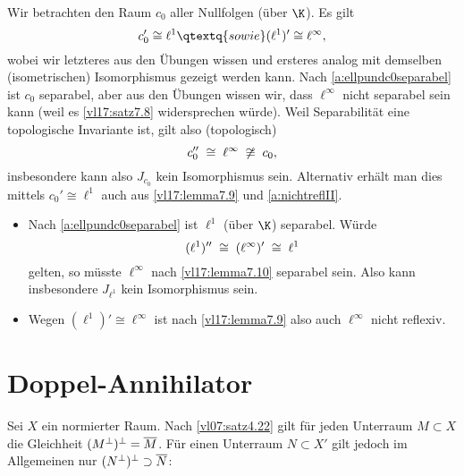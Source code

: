 \begin{thBeispiel} \label{a:nichtreflI}
    Wir betrachten den Raum $c_0$ aller Nullfolgen (über $\K$). Es gilt
    \[ c_0' \cong \ell^1 \qtextq{sowie} (\ell^1)' \cong \ell^\infty  , \]
    wobei wir letzteres aus den Übungen wissen und ersteres analog mit demselben
    (isometrischen) Isomorphismus gezeigt werden kann. Nach
    \cref{a:ellpundc0separabel} ist $c_0$ separabel, aber aus den Übungen wissen
    wir, dass $\ell^\infty$ nicht separabel sein kann (weil es \cref{vl17:satz7.8}
    widersprechen würde). Weil Separabilität eine topologische Invariante ist,
    gilt also (topologisch)
    \[ \thickmuskip=10mu
        c_0'' \cong \ell^\infty \not\cong c_0
    , \]
    insbesondere kann also $J_{c_0}$ kein Isomorphismus sein.
    Alternativ erhält man dies mittels $c_0' \cong \ell^1$ 
    auch aus \cref{vl17:lemma7.9} und \cref{a:nichtreflII}.
\end{thBeispiel}

\begin{thBeispiel} \label{a:nichtreflII} \hfill
    \begin{itemize}
        \item
            Nach \cref{a:ellpundc0separabel} ist $\ell^1$ (über $\K$) separabel.
            Würde
            \[ \thickmuskip=10mu
                (\ell^1) '' \cong (\ell^\infty)' \cong \ell^1
            \]
            gelten, so müsste $\ell^\infty$ nach \cref{vl17:lemma7.10} separabel sein.
            Also kann insbesondere $J_{\ell^1}$ kein Isomorphismus sein.
        
        \item
            Wegen $(\ell^1)' \cong \ell^\infty$ ist nach \cref{vl17:lemma7.9} also auch
            $\ell^\infty$ nicht reflexiv.
    \end{itemize}
\end{thBeispiel}

\section{Doppel-Annihilator}
Sei $X$ ein normierter Raum. Nach \cref{vl07:satz4.22} gilt für jeden Unterraum
$M\subset X$ die Gleichheit $(M^\perp)^\perp = \overline{M}$. Für einen
Unterraum $N\subset X'$ gilt jedoch im Allgemeinen nur $(N^\perp)^\perp \supset
\overline{N}$:

